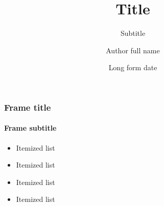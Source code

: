 \documentclass[12pt]{beamer}
\title{Title}
\subtitle{Subtitle}
\author[Author]{Author full name}
\institute[Inst]{Institute full name}
\date[Date]{Long form date}
\begin{document}
\begin{frame}[plain]
  \titlepage
\end{frame}

\begin{frame}
  \frametitle{Frame title}
  \framesubtitle{Frame subtitle}
  \begin{itemize}
    \item Itemized list
    \item Itemized list
    \item Itemized list
    \item Itemized list
  \end{itemize}
\end{frame}
\end{document}

